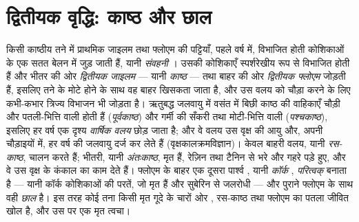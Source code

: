 \section{द्वितीयक वृद्धि: काष्ठ और छाल}

\begin{definition}[संवहनी कैंबियम और काष्ठ]\label{def:b2:plant-meristems:wood}
किसी काष्ठीय तने में प्राथमिक जाइलम तथा फ्लोएम की पट्टियाँ, पहले वर्ष
में, विभाजित होती कोशिकाओं के एक सतत बेलन में जुड़ जाती हैं, यानी
\emph{संवहनी }। उसकी कोशिकाएँ स्पर्शरेखीय रूप से विभाजित होती
हैं और भीतर की ओर \emph{द्वितीयक जाइलम} --- यानी \emph{काष्ठ} --- तथा
बाहर की ओर \emph{द्वितीयक फ्लोएम} जोड़ती हैं, इसलिए तने के मोटे होने के
साथ वह  बाहर खिसकता जाता है, और उस वलय को चौड़ा करने के लिए
कभी-कभार त्रिज्य विभाजन भी जोड़ता है। ऋतुबद्ध जलवायु में वसंत में बिछी
काष्ठ की वाहिकाएँ चौड़ी और पतली-भित्ति वाली होती हैं (\emph{पूर्वकाष्ठ})
और गर्मी की सँकरी तथा मोटी-भित्ति वाली (\emph{पश्चकाष्ठ}), इसलिए हर
वर्ष एक दृश्य \emph{वार्षिक वलय} छोड़ जाता है; और वे वलय उस
वृक्ष की आयु और, अपनी चौड़ाइयों में, हर वर्ष की जलवायु दर्ज कर लेते हैं
(वृक्षकालक्रमविज्ञान)। केवल बाहरी वलय, यानी \emph{रस-काष्ठ},
चालन करते हैं; भीतरी, यानी \emph{अंतःकाष्ठ}, मृत हैं, रेज़िन तथा टैनिन
से भरे और गहरे पड़े हुए, और वे उस वृक्ष के कंकाल का काम देते हैं।
फ्लोएम के बाहर एक दूसरा पार्श्व , यानी
\emph{कॉर्क }, \emph{परित्वक्} बनाता है --- यानी कॉर्क
कोशिकाओं की परतें, जो मृत हैं और सुबेरिन से जलरोधी --- और पुराने
फ्लोएम के साथ वही \emph{छाल} है। इस तरह कोई तना किसी मृत गूदे के चारों
ओर , रस-काष्ठ तथा फ्लोएम का पतला जीवित खोल है, और उस पर एक मृत त्वचा।
\end{definition}

